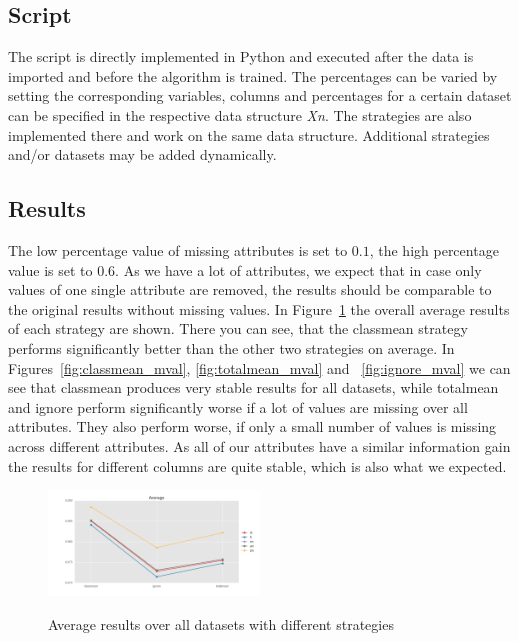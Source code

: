 \documentclass{sig-alternate-05-2015}
\begin{document}
\subsection{Script}

The script is directly implemented in Python and executed after the data is imported and before the algorithm is trained.
The percentages can be varied by setting the corresponding variables, columns and percentages for a certain dataset can be specified in the respective data structure \emph{Xn}.
The strategies are also implemented there and work on the same data structure.
Additional strategies and/or datasets may be added dynamically.

\newpage

\subsection{Results}

The low percentage value of missing attributes is set to $0.1$, the high percentage value is set to $0.6$.
As we have a lot of attributes, we expect that in case only values of one single attribute are removed, the results should be comparable to the original results without missing values.
In Figure~\ref{fig:average_mval} the overall average results of each strategy are shown.
There you can see, that the classmean strategy performs significantly better than the other two strategies on average.
In Figures~\ref{fig:classmean_mval}, \ref{fig:totalmean_mval} and ~\ref{fig:ignore_mval} we can see that classmean produces very stable results for all datasets, while totalmean and ignore perform significantly worse if a lot of values are missing over all attributes.
They also perform worse, if only a small number of values is missing across different attributes.
As all of our attributes have a similar information gain the results for different columns are quite stable, which is also what we expected.

\begin{figure}[h]
  \centering
  \caption{Average results over all datasets with different strategies}
  \includegraphics[width=0.5\textwidth]{../plots/average_missing_values}
  \label{fig:average_mval}
\end{figure}
\end{document}

